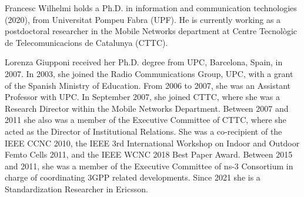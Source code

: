 \documentclass[10pt,journal,compsoc]{IEEEtran}
\begin{document}
% 

\vspace{-1cm}
\begin{IEEEbiography}{Francesc Wilhelmi}
holds a Ph.D. in information and communication technologies (2020), from Universitat Pompeu Fabra (UPF). He is currently working as a postdoctoral researcher in the Mobile Networks department at Centre Tecnològic de Telecomunicacions de Catalunya (CTTC). 
\end{IEEEbiography}

\vspace{-1cm}
\begin{IEEEbiography}{Lorenza Giupponi} received her Ph.D. degree from UPC, Barcelona, Spain, in 2007. In 2003, she joined the Radio Communications Group, UPC, with a grant of the Spanish Ministry of  Education. From 2006 to 2007, she was an Assistant Professor with UPC. In September 2007, she joined CTTC, where she was a Research Director within the Mobile Networks Department. Between 2007 and 2011 she also was a member of the Executive Committee of CTTC, where she acted as the Director of Institutional Relations. She was a co-recipient of the IEEE CCNC 2010, the IEEE 3rd International Workshop on Indoor and Outdoor Femto Cells 2011, and the IEEE WCNC 2018 Best Paper Award. Between 2015 and 2011, she was a member of the Executive Committee of ns-3 Consortium in charge of coordinating 3GPP related developments. Since 2021 she is a Standardization Researcher in Ericsson.
\end{IEEEbiography}
\end{document}
